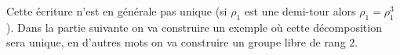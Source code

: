 \begin{remarkk}
  Cette écriture n'est en générale pas unique (si $\rho_1$ est une demi-tour alors $\rho_1=\rho_1^3$). Dans la partie suivante on va construire un exemple où cette décomposition sera unique, en d'autres mots on va construire un groupe libre de rang $2$.
\end{remarkk}
